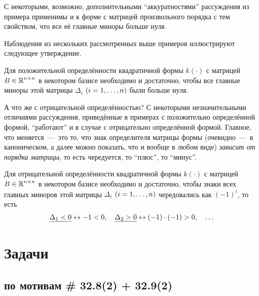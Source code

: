 \documentclass[a4paper,12pt]{article}
\begin{document}
  С некоторыми, возможно, дополнительными ``аккуратностями'' рассуждения из примера применимы и к форме с матрицей произвольного порядка с тем свойством, что все её главные миноры больше нуля.
  
  Наблюдения из нескольких рассмотренных выше примеров иллюстрируют следующее утверждение.
  
  \begin{theorem}
    Для положительной определённости квадратичной формы $k(\cdot)$ с матрицей $B \hm\in \RR^{n \times n}$ в некотором базисе необходимо и достаточно, чтобы все главные миноры этой матрицы $\Delta_i$ $(i \hm= 1, \ldots, n)$ были больше нуля.
  \end{theorem}
  
  А что же с отрицательной определённостью?
  С некоторыми незначительными отличиями рассуждения, приведённые в примерах с положительно определённой формой, ``работают''  и в случае с отрицательно определённой формой.
  Главное, что меняется~---~это то, что знак определителя матрицы формы (очевидно~---~в каноническом, а далее можно показать, что и вообще в любом виде) \emph{зависит от порядка матрицы}, то есть чередуется, то ``плюс'', то ``минус''.
  
  \begin{theorem}
    Для отрицательной определённости квадратичной формы $k(\cdot)$ с матрицей $B \hm\in \RR^{n \times n}$ в некотором базисе необходимо и достаточно, чтобы знаки всех главных миноров этой матрицы $\Delta_i$ $(i \hm= 1, \ldots, n)$ чередовались как $(-1)^i$, то есть
    \[
      \underline{\Delta_1 \hm< 0} \leftrightarrow -1 \hm < 0,\quad \underline{\Delta_2 \hm> 0} \leftrightarrow (-1) \cdot (-1) \hm> 0,\quad \ldots
    \]
  \end{theorem}


  \section{Задачи}
  
  \subsection{по мотивам \# 32.8(2) + 32.9(2)}
  
\end{document}
